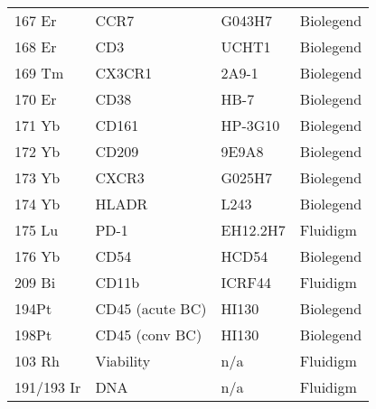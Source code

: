 \begin{table*}[hp]
\begin{tabular}{l l l l}
    167 Er & CCR7 & G043H7 & Biolegend \\
    168 Er & CD3 & UCHT1 & Biolegend \\
    169 Tm & CX3CR1 & 2A9-1 & Biolegend \\
    170 Er & CD38 & HB-7 & Biolegend \\
    171 Yb & CD161 & HP-3G10 & Biolegend \\
    172 Yb & CD209 & 9E9A8 & Biolegend \\
    173 Yb & CXCR3 & G025H7 & Biolegend \\
    174 Yb & HLADR & L243 & Biolegend \\
    175 Lu & PD-1 & EH12.2H7 & Fluidigm \\
    176 Yb & CD54 & HCD54 & Biolegend \\
    209 Bi & CD11b & ICRF44 & Fluidigm \\
    194Pt & CD45 (acute BC) & HI130 & Biolegend \\
    198Pt  & CD45 (conv BC) & HI130 & Biolegend \\
    103 Rh  & Viability & n/a & Fluidigm \\
    191/193 Ir & DNA & n/a & Fluidigm \\
    \bottomrule
  \end{tabular}
\end{table*}

\restoregeometry
\tuftefancyhfoffset

\clearpage
\newpage

